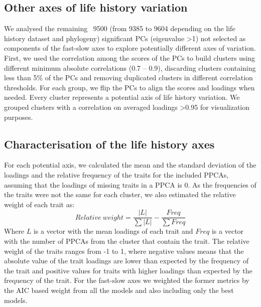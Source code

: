 \subsection*{Other axes of life history variation}

We analysed the remaining ~9500 (from 9385 to 9604 depending on the life 
history dataset and phylogeny) significant PCs (eigenvalue \textgreater{1}) not 
selected as components of the fast-slow axes to explore potentially different
axes of variation. First, we used the correlation among the scores of the PCs to
build clusters using different minimum absolute correlations (0.7 – 0.9),
discarding clusters containing less than 5\% of the PCs and removing duplicated
clusters in different correlation thresholds.
For each group, we flip the PCs to align the scores and loadings when needed. 
Every cluster represents a potential axis of life history variation. We grouped 
clusters with a correlation on averaged loadings \textgreater{0.95} for 
visualization purposes.


\subsection*{Characterisation of the life history axes}

For each potential axis, we calculated the mean and the standard deviation of 
the loadings and the relative frequency of the traits for the included PPCAs,
assuming that the loadings of missing traits in a PPCA is 0. As the frequencies
of the traits were not the same for each cluster, we also estimated the
relative weight of each trait as:
$$ Relative~weight = \frac{ \left \lvert L \right \rvert } { \sum{\left \lvert L \right \rvert} } - \frac{ Freq } { \sum{Freq} } $$
%
%
%
%
Where $L$ is a vector with the mean loadings of each trait and $Freq$ is a
vector with the number of PPCAs from the cluster that contain the trait. The
relative weight of the traits ranges from -1 to 1, where negative values means
that the absolute value of the trait loadings are lower than expected by the
frequency of the trait and positive values for traits with higher loadings than
expected by the frequency of the trait. For the fast-slow axes we weighted the
former metrics by the AIC based weight from all the models and also including
only the best models.


